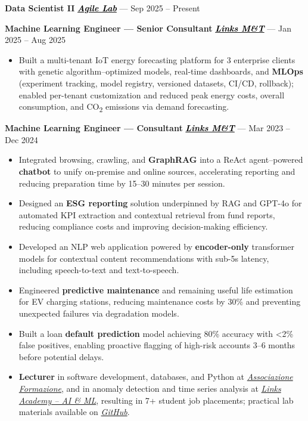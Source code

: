 \documentclass[11pt,a4paper]{article}
\let\OldHref\href
\renewcommand{\href}[2]{\OldHref{#1}{\textit{#2}}}
\begin{document}
	{\small
		\textbf{Data Scientist II} \hfill \href{https://www.agilelab.it/}{\textbf{\textcolor{black}{Agile Lab}}} — Sep 2025 -- Present
		
		\textbf{Machine Learning Engineer — Senior Consultant} \hfill \href{https://www.linksmt.it/}{\textbf{\textcolor{black}{Links M\&T}}} — Jan 2025 -- Aug 2025
		\begin{itemize}
			\item Built a multi-tenant IoT energy forecasting platform for 3 enterprise clients with genetic algorithm–optimized models, real-time dashboards, and \textbf{MLOps} (experiment tracking, model registry, versioned datasets, CI/CD, rollback); enabled per-tenant customization and reduced peak energy costs, overall consumption, and CO\textsubscript{2} emissions via demand forecasting.
		\end{itemize}
		
		\textbf{Machine Learning Engineer — Consultant} \hfill \href{https://www.linksmt.it/}{\textbf{\textcolor{black}{Links M\&T}}} — Mar 2023 -- Dec 2024
		\begin{itemize}
			\item Integrated browsing, crawling, and \textbf{GraphRAG} into a ReAct agent–powered \textbf{chatbot} to unify on-premise and online sources, accelerating reporting and reducing preparation time by 15--30 minutes per session.
			\item Designed an \textbf{ESG reporting} solution underpinned by RAG and GPT-4o for automated KPI extraction and contextual retrieval from fund reports, reducing compliance costs and improving decision-making efficiency.
			\item Developed an NLP web application powered by \textbf{encoder-only} transformer models for contextual content recommendations with sub-5s latency, including speech-to-text and text-to-speech.
			\item Engineered \textbf{predictive maintenance} and remaining useful life estimation for EV charging stations, reducing maintenance costs by 30\% and preventing unexpected failures via degradation models.
			\item Built a loan \textbf{default prediction} model achieving 80\% accuracy with <2\% false positives, enabling proactive flagging of high-risk accounts 3--6 months before potential delays.
			\item \textbf{Lecturer} in software development, databases, and Python at \href{https://www.associazioneformazione.it/formazione-professionale/ifts-tecnico-per-la-progettazione-e-lo-sviluppo-di-applicazioni-informatiche}{\textit{Associazione Formazione}}, and in anomaly detection and time series analysis at \href{https://academy.linksmt.it/corso-di-formazione-post-laurea-artificial-intelligence-machine-learning/}{\textit{Links Academy – AI \& ML}}, resulting in 7+ student job placements; practical lab materials available on \href{https://github.com/francesco-s/Links-Academy---Anomaly-Detection-Time-series-analysis}{\textit{GitHub}}.	
		\end{itemize}
		
}
\end{document}
